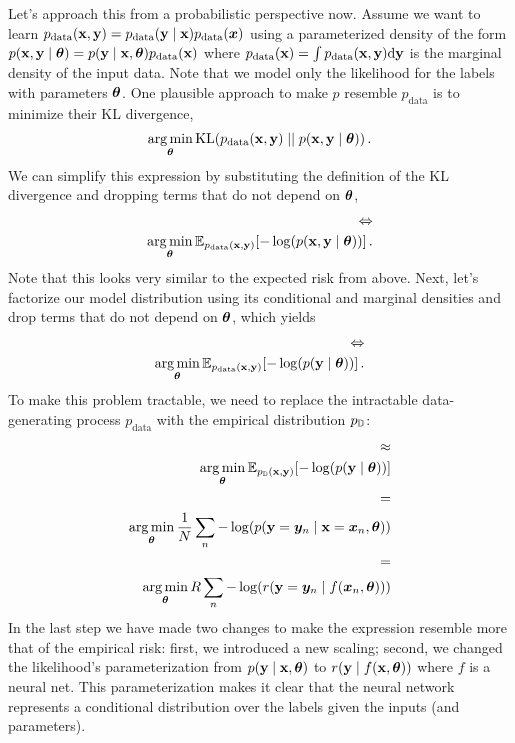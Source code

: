 Let's approach this from a probabilistic perspective now.
Assume we want to learn $p_{\text{data}}({\mathbf{x}}, {\mathbf{y}}) = p_{\text{data}}({\mathbf{y}} \mid {\mathbf{x}}) p_{\text{data}}({\bm{x}})$ using a parameterized density of the form $p({\mathbf{x}}, {\mathbf{y}} \mid {\bm{\theta}}) = p({\mathbf{y}} \mid {\mathbf{x}}, {\bm{\theta}}) p_{\text{data}}({\mathbf{x}})$ where $p_{\text{data}}({\mathbf{x}}) = \int p_{\text{data}}({\mathbf{x}}, {\mathbf{y}}) \mathrm{d}{\mathbf{y}}$ is the marginal density of the input data.
Note that we model only the likelihood for the labels with parameters ${\bm{\theta}}$.
One plausible approach to make $p$ resemble $p_{\text{data}}$ is to minimize their KL divergence,
\begin{align*}
  \operatorname*{arg\,min}_{{\bm{\theta}}} \mathrm{KL}(p_{\text{data}}({\mathbf{x}}, {\mathbf{y}}) \mid\mid p({\mathbf{x}}, {\mathbf{y}} \mid {\bm{\theta}}))\,.
\end{align*}
We can simplify this expression by substituting the definition of the KL divergence and dropping terms that do not depend on ${\bm{\theta}}$,
\begin{align*}
  \Leftrightarrow
  \\
  \operatorname*{arg\,min}_{{\bm{\theta}}} \mathbb{E}_{p_{\text{data}}({\mathbf{x}}, {\mathbf{y}})}[- \log( p({\mathbf{x}}, {\mathbf{y}} \mid {\bm{\theta}}))]\,.
\end{align*}
Note that this looks very similar to the expected risk from above.
Next, let's factorize our model distribution using its conditional and marginal densities and drop terms that do not depend on ${\bm{\theta}}$, which yields
\begin{align*}
  \Leftrightarrow
  \\
  \operatorname*{arg\,min}_{{\bm{\theta}}} \mathbb{E}_{p_{\text{data}}({\mathbf{x}}, {\mathbf{y}})}[- \log( p({\mathbf{y}} \mid {\bm{\theta}}))]\,.
\end{align*}
To make this problem tractable, we need to replace the intractable data-generating process $p_{\text{data}}$ with the empirical distribution $p_{{\mathbb{D}}}$:
\begin{align*}
  \approx
  \\
  \operatorname*{arg\,min}_{{\bm{\theta}}} \mathbb{E}_{p_{{\mathbb{D}}}({\mathbf{x}}, {\mathbf{y}})}[- \log( p({\mathbf{y}} \mid {\bm{\theta}}))]
  \\
  =
  \\
  \operatorname*{arg\,min}_{{\bm{\theta}}} \frac{1}{N} \sum_n - \log( p({\mathbf{y}} = {\bm{y}}_n \mid {\mathbf{x}}={\bm{x}}_n,{\bm{\theta}}))
  \\
  =
  \\
  \operatorname*{arg\,min}_{{\bm{\theta}}} R \sum_n - \log( r({\mathbf{y}} = {\bm{y}}_n \mid f({\bm{x}}_n,{\bm{\theta}})))
\end{align*}
In the last step we have made two changes to make the expression resemble more that of the empirical risk: first, we introduced a new scaling; second, we changed the likelihood's parameterization from $p({\mathbf{y}} \mid {\mathbf{x}}, {\bm{\theta}})$ to $r({\mathbf{y}} \mid f({\mathbf{x}}, {\bm{\theta}}))$ where $f$ is a neural net. This parameterization makes it clear that the neural network represents a conditional distribution over the labels given the inputs (and parameters).

